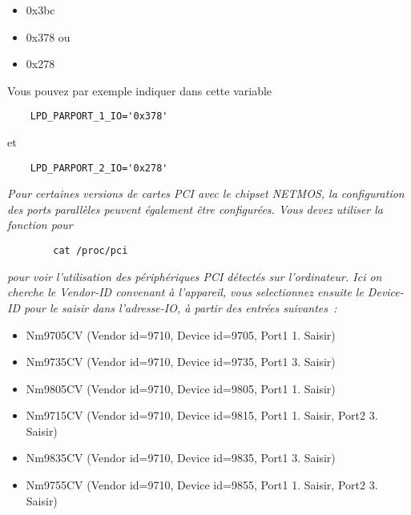 \begin{description}
\begin{itemize}
\item 0x3bc
\item 0x378 ou
\item 0x278
\end{itemize}

    Vous pouvez par exemple indiquer dans cette variable

\begin{example}
\begin{verbatim}
    LPD_PARPORT_1_IO='0x378'
\end{verbatim}
\end{example}

    et

\begin{example}
\begin{verbatim}
    LPD_PARPORT_2_IO='0x278'
\end{verbatim}
\end{example}


    \emph{Pour certaines versions de cartes PCI avec le chipset NETMOS, la configuration
    des ports parallèles peuvent également être configurées. Vous devez utiliser
    la fonction pour}

\begin{example}
\begin{verbatim}
        cat /proc/pci
\end{verbatim}
\end{example}
    \emph{pour voir l'utilisation des périphériques PCI détectés sur l'ordinateur. Ici
    on cherche le Vendor-ID convenant à l'appareil, vous selectionnez ensuite le
    Device-ID pour le saisir dans l'adresse-IO, à partir des entrées suivantes~:}

        \begin{itemize}
        \item Nm9705CV  (Vendor id=9710, Device id=9705, Port1 1. Saisir)
        \item Nm9735CV  (Vendor id=9710, Device id=9735, Port1 3. Saisir)
        \item Nm9805CV  (Vendor id=9710, Device id=9805, Port1 1. Saisir)
        \item Nm9715CV  (Vendor id=9710, Device id=9815, Port1 1. Saisir, Port2 3. Saisir)
        \item Nm9835CV  (Vendor id=9710, Device id=9835, Port1 3. Saisir)
        \item Nm9755CV  (Vendor id=9710, Device id=9855, Port1 1. Saisir, Port2 3. Saisir)
        \end{itemize}


\end{description}
